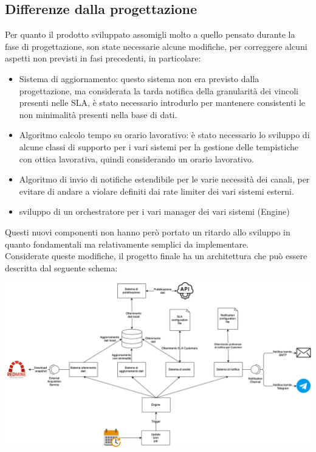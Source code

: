 	\subsection{Differenze dalla progettazione}
		Per quanto il prodotto sviluppato assomigli molto a quello pensato durante la fase di progettazione, son state necessarie alcune modifiche, per correggere alcuni aspetti non previsti in fasi precedenti, in particolare:
		\begin{itemize}
			\item Sistema di aggiornamento: questo sistema non era previsto dalla progettazione, ma considerata la tarda notifica della granularità dei vincoli presenti nelle SLA, è stato necessario introdurlo per mantenere consistenti le non minimalità presenti nella base di dati.
			\item Algoritmo calcolo tempo su orario lavorativo: è stato necessario lo sviluppo di alcune classi di supporto per i vari sistemi per la gestione delle tempistiche con ottica lavorativa, quindi considerando un orario lavorativo.
			\item Algoritmo di invio di notifiche estendibile per le varie necessità dei canali, per evitare di andare a violare definiti dai rate limiter dei vari sistemi esterni.
			\item sviluppo di un orchestratore per i vari manager dei vari sistemi (Engine)
		\end{itemize}
		Questi nuovi componenti non hanno però portato un ritardo allo sviluppo in quanto fondamentali ma relativamente semplici da implementare. \\
		Considerate queste modifiche, il progetto finale ha un architettura che può essere descritta dal seguente schema:
		\begin{center}
			\includegraphics[keepaspectratio = true, width=16cm]{immagini/architettura-finale.png}
		\end{center}
		
